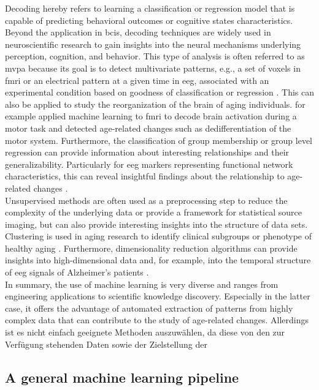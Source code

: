 Decoding hereby refers to learning a classification or regression model that is capable of predicting behavioral outcomes or cognitive states characteristics. Beyond the application in \glspl{bci}, decoding techniques are widely used in neuroscientific research to gain insights into the neural mechanisms underlying perception, cognition, and behavior. This type of analysis is often referred to as \gls{mvpa} because its goal is to detect multivariate patterns, e.g., a set of voxels in \gls{fmri} or an electrical pattern at a given time in \gls{eeg}, associated with an experimental condition based on goodness of classification or regression \cite{Holdgraf2017}. This can also be applied to study the reorganization of the brain of aging individuals. \cite{Carb2011} for example applied machine learning to \gls{fmri} to decode brain activation during a motor task and detected age-related changes such as dedifferentiation of the motor system. Furthermore, the classification of group membership or group level regression can provide information about interesting relationships and their generalizability. Particularly for \gls{eeg} markers representing functional network characteristics, this can reveal insightful findings about the relationship to age-related changes \cite{Petti2016}.\\
Unsupervised methods are often used as a preprocessing step to reduce the complexity of the underlying data or provide a framework for statistical source imaging, but can also provide interesting insights into the structure of data sets. Clustering is used in aging research to identify clinical subgroups or phenotype of healthy aging \cite{Marron2019}. Furthermore, dimensionality reduction algorithms can provide insights into high-dimensional data and, for example, into the temporal structure of \gls{eeg} signals of Alzheimer's patients \cite{Smailovic2019}.\\
In summary, the use of machine learning is very diverse and ranges from engineering applications to scientific knowledge discovery. Especially in the latter case, it offers the advantage of automated extraction of patterns from highly complex data that can contribute to the study of age-related changes. 
Allerdings ist es nicht einfach geeignete Methoden auszuwählen, da diese von den zur Verfügung stehenden Daten sowie der Zielstellung der 

\subsection{A general machine learning pipeline}



